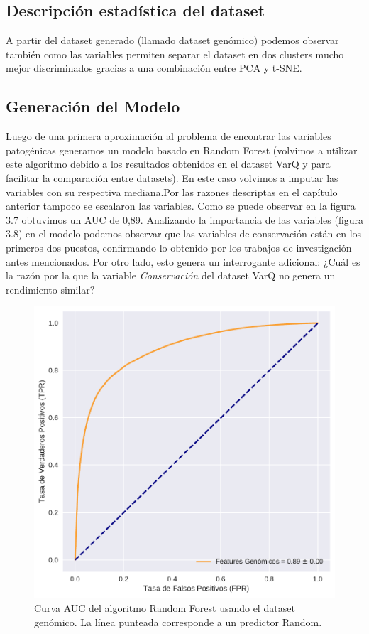 \subsection{Descripción estadística del dataset}

A partir del dataset generado (llamado dataset genómico) podemos observar también como las variables permiten separar el dataset en dos clusters mucho mejor discriminados gracias a una combinación entre PCA y t-SNE.



\subsection{Generación del Modelo}

Luego de una primera aproximación al problema de encontrar las variables patogénicas generamos un modelo basado en Random Forest (volvimos a utilizar este algoritmo debido a los resultados obtenidos en el dataset VarQ y para facilitar la comparación entre datasets). En este caso volvimos a imputar las variables con su respectiva mediana.Por las razones descriptas en el capítulo anterior tampoco se escalaron las variables. Como se puede observar en la figura 3.7 obtuvimos un AUC de 0,89. 
Analizando la importancia de las variables (figura 3.8) en el modelo podemos observar que las variables de conservación están en los primeros dos puestos, confirmando lo obtenido por los trabajos de investigación antes mencionados. Por otro lado, esto genera un interrogante adicional: ¿Cuál es la razón por la que la variable \textit{Conservación} del dataset VarQ no genera un rendimiento similar?


\begin{figure}[H]
    \centering
    \includegraphics[scale=0.55]{documents/latex/figures/3/auc_2.pdf}
    \caption{Curva AUC del algoritmo Random Forest usando el dataset genómico. La línea punteada corresponde a un predictor Random.}
    \label{fig:auc_2}
\end{figure}

